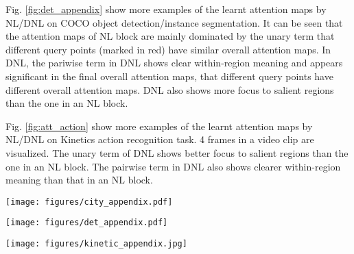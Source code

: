\documentclass[runningheads]{llncs}
\begin{document}
Fig. \ref{fig:det_appendix} show more examples of the learnt attention maps by NL/DNL on COCO object detection/instance segmentation.
It can be seen that the attention maps of NL block are mainly dominated by the unary term that different query points (marked in red) have similar overall attention maps. In DNL, the pariwise term in DNL shows clear within-region meaning and appears significant in the final overall attention maps, that different query points have different overall attention maps.
DNL also shows more focus to salient regions  than the one in an NL block.

Fig. \ref{fig:att_action} show more examples of the learnt attention maps by NL/DNL on Kinetics action recognition task. 4 frames in a video clip are visualized. The unary term of DNL shows better focus to salient regions than the one in an NL block. The pairwise term in DNL also shows clearer within-region meaning than that in an NL block.

\begin{figure*}[]
\centering
\texttt{[image: figures/city\_appendix.pdf]}
\caption{Visualization of attention maps of NL block and our DNL block on Cityscapes Dataset. The query points are marked in white cross}
\label{fig:city_appendix}
\end{figure*}
\begin{figure*}[]
\centering
\texttt{[image: figures/det\_appendix.pdf]}
\caption{Visualization of attention maps of NL block and our DNL block on COCO object detection task. The query points are marked in red.}
\label{fig:det_appendix}
\end{figure*}
\begin{figure*}[]
\centering
\texttt{[image: figures/kinetic\_appendix.jpg]}
\caption{Visualization of attention maps of NL block and our DNL block on Kinetics action recognition. 4 frames of a video clip are visualized. For each sample of each block, two different queries are chosen as the top and bottom rows. The query points are marked in red}
\label{fig:att_action}
\end{figure*}
\end{document}
